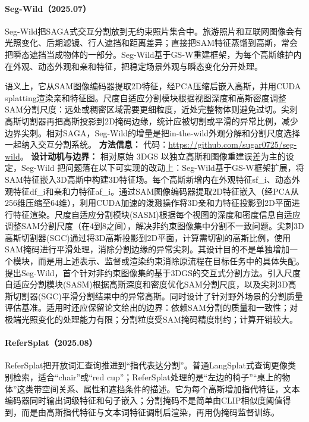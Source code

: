 \paragraph{Seg-Wild（2025.07）\cite{2507_07395}}
Seg-Wild把SAGA式交互分割放到无约束照片集合中。旅游照片和互联网图像会有光照变化、后期滤镜、行人遮挡和距离差异；直接把SAM特征蒸馏到高斯，常会把瞬态遮挡当成物体的一部分。Seg-Wild基于GS-W重建框架，为每个高斯维护内在外观、动态外观和亲和特征，把稳定场景外观与瞬态变化分开处理。

语义上，它从SAM图像编码器提取2D特征，经PCA压缩后嵌入高斯，并用CUDA splatting渲染亲和特征图。尺度自适应分割模块根据视图深度和高斯密度调整SAM分割尺度：远处或稠密区域需要更细粒度，近处完整物体则避免过切。尖刺高斯切割器再把高斯投影到2D掩码边缘，统计应被切割或平滑的异常比例，减少边界尖刺。相对SAGA，Seg-Wild的增量是把in-the-wild外观分解和分割尺度选择一起纳入交互分割系统。
\textbf{方法信息：} 代码：\url{https://github.com/sugar0725/seg-wild}。
\textbf{设计动机与边界：} 相对原始 3DGS 以独立高斯和图像重建误差为主的设定，Seg-Wild 把问题落在以下可实现的改动上：Seg-Wild基于GS-W框架扩展，将SAM特征嵌入3D高斯中构建3D特征场。每个高斯新增内在外观特征sf\_i、动态外观特征df\_i和亲和力特征af\_i。通过SAM图像编码器提取2D特征嵌入（经PCA从256维压缩至64维），利用CUDA加速的泼溅操作将3D亲和力特征投影到2D平面进行特征渲染。尺度自适应分割模块(SASM)根据每个视图的深度和密度信息自适应调整SAM分割尺度（在4到8之间），解决非约束图像集中分割不一致问题。尖刺3D高斯切割器(SGC)通过将3D高斯投影到2D平面，计算需切割的高斯比例，使用SAM掩码进行平滑处理，消除分割边缘的异常尖刺。其设计目的不是单独增加一个模块，而是用上述表示、监督或渲染约束消除原流程在目标任务中的具体失配。提出Seg-Wild，首个针对非约束图像集的基于3DGS的交互式分割方法。引入尺度自适应分割模块(SASM)根据高斯深度和密度优化SAM分割尺度，以及尖刺3D高斯切割器(SGC)平滑分割结果中的异常高斯。同时设计了针对野外场景的分割质量评估基准。适用时还应保留论文给出的边界：依赖SAM分割的质量和一致性；对极端光照变化的处理能力有限；分割粒度受SAM掩码精度制约；计算开销较大。
\paragraph{ReferSplat（2025.08）\cite{2508_08252}}
ReferSplat把开放词汇查询推进到“指代表达分割”。普通LangSplat式查询更像类别检索，适合“chair”或“red cup”；ReferSplat处理的是“左边的椅子”“桌上的物体”这类带空间关系、属性和遮挡条件的描述。它为每个高斯增加指代特征，文本编码器同时输出词级特征和句子嵌入；分割掩码不是简单由CLIP相似度阈值得到，而是由高斯指代特征与文本词特征调制后渲染，再用伪掩码监督训练。


